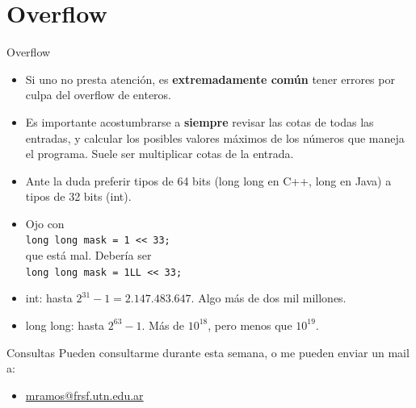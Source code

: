 \documentclass{beamer}
\begin{document}
\section{Overflow}
\begin{frame}{Overflow}
    \begin{itemize}
        \item Si uno no presta atención, es \textbf{extremadamente común} tener errores por culpa del overflow de enteros.
        \item Es importante acostumbrarse a \textbf{siempre} revisar las cotas de todas las entradas, y calcular los posibles valores máximos de los números que maneja el programa. Suele ser multiplicar cotas de la entrada.
        \item Ante la duda preferir tipos de 64 bits (long long en C++, long en Java) a tipos de 32 bits (int).
        \item Ojo con \\ \texttt{long long mask = 1 << 33;} \\  que está mal. Debería ser \\ \texttt{long long mask = 1LL << 33;}
        \item int: hasta $2^{31}-1 = 2.147.483.647$. Algo más de dos mil millones.
        \item long long: hasta $2^{63}-1$. Más de $10^{18}$, pero menos que $10^{19}$.
    \end{itemize}
\end{frame}


\begin{frame}{Consultas}
Pueden consultarme durante esta semana, o me pueden enviar un mail a:
        \begin{itemize}
            \item \href{mailto:mramos@frsf.utn.edu.ar}{mramos@frsf.utn.edu.ar}
        \end{itemize}
\end{frame}
\end{document}
